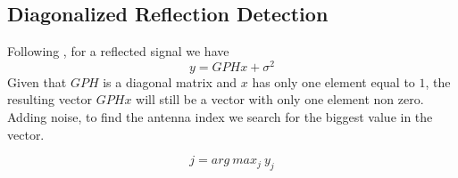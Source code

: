 \subsection{Diagonalized Reflection Detection}
Following \cite{9328149}, for a reflected signal we have
\begin{equation}
  y = GPHx + \sigma^2
\end{equation}
Given that $GPH$ is a diagonal matrix and $x$ has only one element equal to $1$, the resulting vector $GPHx$ will still be a vector with only one element non zero. Adding noise, to find the antenna index we search for the biggest value in the vector.

\begin{equation}
  j = arg\ max_j\ y_j
  \label{eq:reflection_detection}
\end{equation}